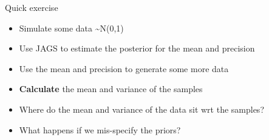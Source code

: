 \documentclass[
  ignorenonframetext,
]{beamer}
\providecommand{\tightlist}{%
  \setlength{\itemsep}{0pt}\setlength{\parskip}{0pt}}
\begin{document}
\begin{frame}{Quick exercise}
\protect\hypertarget{quick-exercise}{}
\begin{itemize}
\tightlist
\item
  Simulate some data \textasciitilde N(0,1)
\item
  Use JAGS to estimate the posterior for the mean and precision
\item
  Use the mean and precision to generate some more data
\item
  \textbf{Calculate} the mean and variance of the samples
\item
  Where do the mean and variance of the data sit wrt the samples?
\item
  What happens if we mis-specify the priors?
\end{itemize}
\end{frame}
\end{document}
